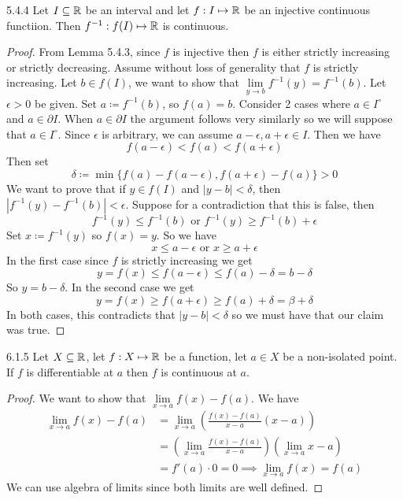 \documentclass[openany]{report}
\begin{document}
\begin{manualtheorem}{5.4.4}
    Let $I \subseteq \mathbb{R}$ be an interval and let $f : I \mapsto \mathbb{R}$ be an injective continuous functiion. Then $f^{-1}: f(I) \mapsto \mathbb{R}$ is continuous. 
\end{manualtheorem}
\begin{proof}
    From Lemma 5.4.3, since $f$ is injective then $f$ is either strictly increasing or strictly decreasing. Assume without loss of generality that $f$ is strictly increasing. Let $b \in f(I)$, we want to show that $\lim\limits_{y\rightarrow b} f^{-1}(y) = f^{-1}(b)$. Let $\epsilon > 0$ be given. Set $a \coloneqq f^{-1}(b)$, so $f(a) = b$. Consider 2 cases where $a \in I^{\circ}$ and $a \in \partial I$. When $a \in \partial I$ the argument follows very similarly so we will suppose that $a \in I^{\circ}$. Since $\epsilon$ is arbitrary, we can assume $a - \epsilon, a + \epsilon \in I$. Then we have
    \[f(a - \epsilon) < f(a) < f(a + \epsilon)\]
    Then set 
    \[\delta \coloneqq \min\{f(a) - f(a - \epsilon), f(a + \epsilon) - f(a)\} > 0\]
    We want to prove that if $y \in f(I)$ and $|y - b| < \delta$, then $|f^{-1}(y) - f^{-1}(b)| < \epsilon$. Suppose for a contradiction that this is false, then 
    \[f^{-1}(y) \leq f^{-1}(b) \text{ or } f^{-1}(y) \geq f^{-1}(b) + \epsilon\]
    Set $x \coloneqq f^{-1}(y)$ so $f(x) = y$. So we have 
    \[x \leq a - \epsilon \text{ or } x \geq a + \epsilon\]
    In the first case since $f$ is strictly increasing we get 
    \[y = f(x) \leq f(a - \epsilon) \leq f(a) - \delta = b - \delta\]
    So $y = b - \delta$. In the second case we get 
    \[y = f(x) \geq f(a + \epsilon) \geq f(a) + \delta = \beta + \delta\]
    In both cases, this contradicts that $|y - b| < \delta$ so we must have that our claim was true. 
\end{proof}

\begin{manualprop}{6.1.5}
    Let $X \subseteq \mathbb{R}$, let $f: X \mapsto \mathbb{R}$ be a function, let $a \in X$ be a non-isolated point. If $f$ is differentiable at $a$ then $f$ is continuous at $a$.
\end{manualprop}
\begin{proof}
    We want to show that $\lim\limits_{x\rightarrow a}f(x) - f(a)$. We have 
    \begin{align*}
        \lim_{x\rightarrow a}f(x) - f(a) &= \lim_{x\rightarrow a}\left(\frac{f(x) - f(a)}{x - a}(x - a)\right)\\
        &= \left(\lim_{x\rightarrow a} \frac{f(x) - f(a)}{x-a}\right)\left(\lim_{x\rightarrow a} x- a\right)\\
        &= f'(a) \cdot 0 = 0 \implies \lim_{x\rightarrow a} f(x) = f(a)
    \end{align*}
    We can use algebra of limits since both limits are well defined.
\end{proof}
\end{document}
